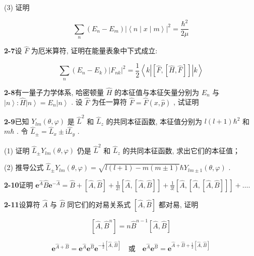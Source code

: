 (3) 证明

\begin{equation}\tag{3}
\sum_ {n} \left(E _ {n} - E _ {m}\right) \left| \left\langle n \mid x \mid m \right\rangle \right| ^ {2} = \frac {\hbar^ {2}}{2 \mu}
\end{equation}

\vfill

\newpage
\vfill

\noindent
\textbf{2-7}\quad 设 $\hat{F}$ 为厄米算符, 证明在能量表象中下式成立:

$$
\sum_ {n} (E _ {n} - E _ {k}) \left| F _ {n k} \right| ^ {2} = \frac {1}{2} \left\langle k \left| [ \hat {F}, [ \hat {H}, \hat {F} ] ] \right| k \right\rangle
$$

\vfill

\newpage
\vfill

\noindent
\textbf{2-8}\quad 有一量子力学体系, 哈密顿量 $\hat{H}$ 的本征值与本征矢量分别为 $E_{n}$ 与 $\left|n\right\rangle: \hat{H}\left|n\right\rangle = E_{n}\left|n\right\rangle$ . 设 $\hat{F}$ 为任一算符 $\hat{F} = \hat{F}(x, \hat{p})$ , 试证明

\vfill

\newpage
\vfill

\noindent
\textbf{2-9}\quad 已知 $Y_{lm}(\theta, \varphi)$ 是 $\hat{L}^2$ 和 $\hat{L}_z$ 的共同本征函数, 本征值分别为 $l(l + 1)\hbar^2$ 和 $m\hbar$ . 令 $\hat{L}_{\pm} = \hat{L}_x \pm \mathrm{i}\hat{L}_y$ . 

(1) 证明 $\hat{L}_{\pm}Y_{lm}(\theta, \varphi)$ 仍是 $\hat{L}^2$ 和 $\hat{L}_z$ 的共同本征函数, 求出它们的本征值；

(2) 推导公式 $\hat{L}_{\pm}Y_{lm}(\theta, \varphi) = \sqrt{l(l + 1) - m(m \pm 1)}\hbar Y_{lm \pm 1}(\theta, \varphi)$ .

\vfill

\newpage
\vfill

\noindent
\textbf{2-10}\quad 证明 $\mathbf{e}^{\hat{A}}\hat{B}\mathbf{e}^{-\hat{A}} = \hat{B} + [\hat{A},\hat{B}] + \frac{1}{2!} [\hat{A},[\hat{A},\hat{B}]] + \frac{1}{3!} [\hat{A},[\hat{A},[\hat{A},\hat{B}]]] + \dots .$

\vfill

\newpage
\vfill

\noindent
\textbf{2-11}\quad 设算符 $\hat{A}$ 与 $\hat{B}$ 同它们的对易关系式 $[\hat{A},\hat{B}]$ 都对易, 证明

$$
[ \hat {A}, \hat {B} ^ {n} ] = n \hat {B} ^ {n - 1} [ \hat {A}, \hat {B} ]
$$

$$
\mathbf {e} ^ {\hat {A} + \hat {B}} = \mathbf {e} ^ {\hat {A}} \mathbf {e} ^ {\hat {B}} \mathbf {e} ^ {- \frac {1}{2} [ \hat {A}, \hat {B} ]} \quad \text {或} \quad \mathbf {e} ^ {\hat {A}} \mathbf {e} ^ {\hat {B}} = \mathbf {e} ^ {\hat {A} + \hat {B} + \frac {1}{2} [ \hat {A}, \hat {B} ]}
$$

